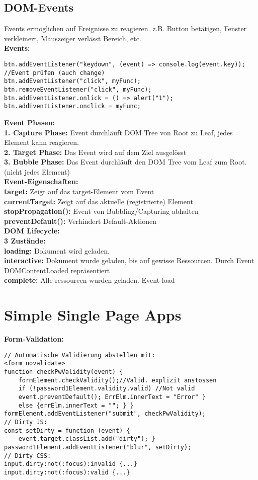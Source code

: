 \documentclass[7pt,landscape,a4paper]{scrartcl}
\begin{document}
\begin{multicols*}{4}
\subsection{DOM-Events}
	Events ermöglichen auf Ereignisse zu reagieren. z.B. Button betätigen, Fenster verkleinert, Mauszeiger verlässt Bereich, etc.\\
	\textcolor{b}{\textbf{Events:}}
\begin{lstlisting}[style=htmlcssjs]
btn.addEventListener("keydown", (event) => console.log(event.key)); //Event prüfen (auch change)
btn.addEventListener("click", myFunc);
btn.removeEventListener("click", myFunc);
btn.addEventListener.onlick = () => alert("1");
btn.addEventListener.onclick = myFunc;
\end{lstlisting}
	\textcolor{b}{\textbf{Event Phasen:}}\\
	\textbf{1. Capture Phase:} Event durchläuft DOM Tree von Root zu Leaf, jedes Element kann reagieren.\\
	\textbf{2. Target Phase:} Das Event wird auf dem Ziel ausgelösst\\
	\textbf{3. Bubble Phase:} Das Event durchläuft den DOM Tree vom Leaf zum Root. (nicht jedes Element)\\
	\textcolor{b}{\textbf{Event-Eigenschaften:}}\\
	\textbf{target:} Zeigt auf das target-Element vom Event\\
	\textbf{currentTarget:} Zeigt auf das aktuelle (registrierte) Element\\
	\textbf{stopPropagation():} Event von Bubbling/Capturing abhalten\\
	\textbf{preventDefault():} Verhindert Default-Aktionen\\
	\textcolor{b}{\textbf{DOM Lifecycle:}}\\
	\textbf{3 Zustände:}\\
	\textbf{loading:} Dokument wird geladen.\\
	\textbf{interactive:} Dokument wurde geladen, bis auf gewisse Ressourcen. Durch Event \textcolor{b}{DOMContentLoaded} repräsentiert\\
	\textbf{complete:} Alle ressourcen wurden geladen. Event \textcolor{b}{load}
\section{Simple Single Page Apps}
	\textcolor{b}{\textbf{Form-Validation:}}
\begin{lstlisting}[style=htmlcssjs]
// Automatische Validierung abstellen mit:
<form novalidate>
function checkPwValidity(event) {
	formElement.checkValidity();//Valid. explizit anstossen
	if (!password1Element.validity.valid) //Not valid
	event.preventDefault(); ErrElm.innerText = "Error" }
	else {errElm.innerText = ""; } }
formElement.addEventListener("submit", checkPwValidity);
// Dirty JS:
const setDirty = function (event) {
	event.target.classList.add("dirty"); }
password1Element.addEventListener("blur", setDirty);
// Dirty CSS:
input.dirty:not(:focus):invalid {...}
input.dirty:not(:focus):valid {...}
\end{lstlisting}

\end{multicols*}
\end{document}
